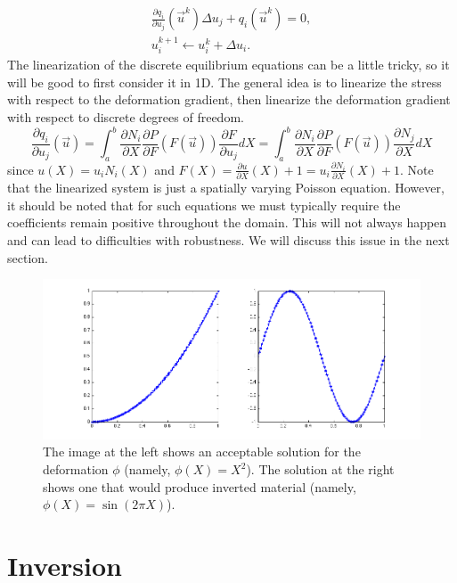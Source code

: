 \begin{gather*}
\frac{\partial q_i}{\partial u_j} \left( \vec{u}^k \right) \Delta{u}_j + q_i \left( \vec{u}^k \right) = 0, \\
u_i^{k+1} \leftarrow u_i^{k} + \Delta{u}_i.
\end{gather*}
The linearization of the discrete equilibrium equations can be a little tricky, so it will be good to first consider it in 1D. The general idea is to linearize the stress with respect to the deformation gradient, then linearize the deformation gradient with respect to discrete degrees of freedom.
\begin{equation*}
\frac{\partial q_i}{\partial u_j} \left( \vec{u} \right) = \int_a^b \frac{\partial N_i}{\partial X} \frac{\partial P}{\partial F} \left( F \left( \vec{u} \right) \right) \frac{\partial F}{\partial u_j} dX = \int_a^b \frac{\partial N_i}{\partial X} \frac{\partial P}{\partial F} \left( F \left( \vec{u} \right) \right) \frac{\partial N_j}{\partial X} dX
\end{equation*}
since $u(X) = u_i N_i(X)$ and $F(X) = \frac{\partial u}{\partial X}(X) + 1 = u_i \frac{\partial N_i}{\partial X}(X) + 1$. Note that the linearized system is just a spatially varying Poisson equation. However, it should be noted that for such equations we must typically require the coefficients remain positive throughout the domain. This will not always happen and can lead to difficulties with robustness. We will discuss this issue in the next section.

\begin{figure}
\includegraphics[width=\columnwidth]{images/elasticity_1d}
\caption{The image at the left shows an acceptable solution for the deformation $\phi$ (namely, $\phi(X) = X^2$). The solution at the right shows one that would produce inverted material (namely, $\phi(X) = \sin \left( 2 \pi X \right)$).}
\label{fig:inversion}
\end{figure}

\section*{Inversion}

